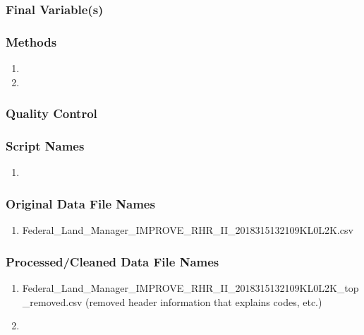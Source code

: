 \subsubsection*{Final Variable(s)}

\subsubsection*{Methods}

\begin{enumerate}
\item 
\item
\end{enumerate}

\subsubsection*{Quality Control}

\subsubsection*{Script Names}

\begin{enumerate}
\item 
\end{enumerate}

\subsubsection*{Original Data File Names}

\begin{enumerate}
\item Federal_Land_Manager_IMPROVE_RHR_II_2018315132109KL0L2K.csv
\end{enumerate}

\subsubsection*{Processed/Cleaned Data File Names}

\begin{enumerate}
\item Federal_Land_Manager_IMPROVE_RHR_II_2018315132109KL0L2K_top_removed.csv (removed header information that explains codes, etc.)
\item
\end{enumerate}